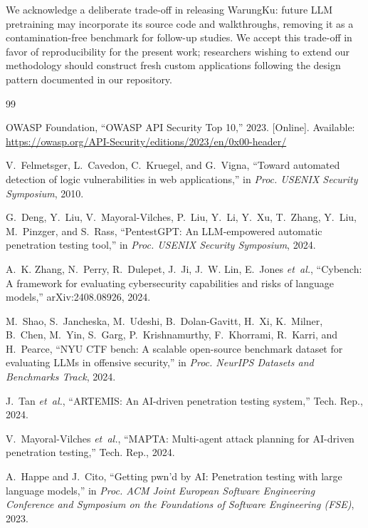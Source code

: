 \documentclass[conference]{IEEEtran}
\begin{document}
We acknowledge a deliberate trade-off in releasing WarungKu: future LLM pretraining may incorporate its source code and walkthroughs, removing it as a contamination-free benchmark for follow-up studies. We accept this trade-off in favor of reproducibility for the present work; researchers wishing to extend our methodology should construct fresh custom applications following the design pattern documented in our repository.

\begin{thebibliography}{99}

OWASP Foundation, ``OWASP API Security Top 10,'' 2023. [Online]. Available: \url{https://owasp.org/API-Security/editions/2023/en/0x00-header/}

V.~Felmetsger, L.~Cavedon, C.~Kruegel, and G.~Vigna, ``Toward automated detection of logic vulnerabilities in web applications,'' in \emph{Proc. USENIX Security Symposium}, 2010.

G.~Deng, Y.~Liu, V.~Mayoral-Vilches, P.~Liu, Y.~Li, Y.~Xu, T.~Zhang, Y.~Liu, M.~Pinzger, and S.~Rass, ``PentestGPT: An LLM-empowered automatic penetration testing tool,'' in \emph{Proc. USENIX Security Symposium}, 2024.

A.~K. Zhang, N.~Perry, R.~Dulepet, J.~Ji, J.~W. Lin, E.~Jones \emph{et~al.}, ``Cybench: A framework for evaluating cybersecurity capabilities and risks of language models,'' arXiv:2408.08926, 2024.

M.~Shao, S.~Jancheska, M.~Udeshi, B.~Dolan-Gavitt, H.~Xi, K.~Milner, B.~Chen, M.~Yin, S.~Garg, P.~Krishnamurthy, F.~Khorrami, R.~Karri, and H.~Pearce, ``NYU CTF bench: A scalable open-source benchmark dataset for evaluating LLMs in offensive security,'' in \emph{Proc. NeurIPS Datasets and Benchmarks Track}, 2024.

J.~Tan \emph{et~al.}, ``ARTEMIS: An AI-driven penetration testing system,'' Tech. Rep., 2024.

V.~Mayoral-Vilches \emph{et~al.}, ``MAPTA: Multi-agent attack planning for AI-driven penetration testing,'' Tech. Rep., 2024.

A.~Happe and J.~Cito, ``Getting pwn'd by AI: Penetration testing with large language models,'' in \emph{Proc. ACM Joint European Software Engineering Conference and Symposium on the Foundations of Software Engineering (FSE)}, 2023.


\end{thebibliography}
\end{document}
